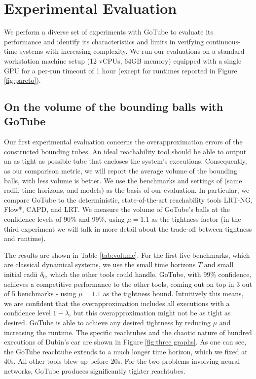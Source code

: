 \documentclass[letterpaper]{article} %
\newcommand{\rd}{\delta}
\begin{document}
\section{Experimental Evaluation}
We perform a diverse set of experiments with GoTube to evaluate its performance and identify its characteristics and limits in verifying continuous-time systems with increasing complexity. We run our evaluations on a standard workstation machine setup (12 vCPUs, 64GB memory) equipped with a single GPU for a per-run timeout of 1 hour (except for runtimes reported in Figure \ref{fig:pareto}).

\subsection{On the volume of the bounding balls with GoTube}
Our first experimental evaluation concerns the overapproximation errors of the constructed bounding tubes.
An ideal reachability tool should be able to output an as tight as possible tube that encloses the system's executions. Consequently, as our comparison metric, we will report the average volume of the bounding balls, with less volume is better.
We use the benchmarks and settings of \cite{gruenbacher2020lagrangian} (same radii, time horizons, and models) as the basis of our evaluation. In particular, we compare GoTube to the deterministic, state-of-the-art reachability tools LRT-NG, Flow*, CAPD, and LRT. We measure the volume of GoTube's balls at the confidence levels of 90\% and 99\%, using $\mu=1.1$ as the tightness factor (in the third experiment we will talk in more detail about the trade-off between tightness and runtime).

The results are shown in Table \ref{tab:volume}. For the first five benchmarks, which are classical dynamical systems, we use the small time horizons $T$ and small initial radii $\rd_0$, which the other tools could handle. GoTube, with 99\% confidence, achieves a competitive performance to the other tools, coming out on top in 3 out of 5 benchmarks - using $\mu=1.1$ as the tightness bound. Intuitively this means, we are confident that the overapproximation includes all executions with a confidence level $1-\lambda$, but this overapproximation might not be as tight as desired. GoTube is able to achieve any desired tightness by reducing $\mu$ and increasing the runtime. The specific reachtubes and the chaotic nature of hundred executions of Dubin's car are shown in Figure \ref{fig:three graphs}. As one can see, the GoTube reachtube extends to a much longer time horizon, which we fixed at 40s. All other tools blew up before 20s. For the two problems involving neural networks, GoTube produces significantly tighter reachtubes.  
\end{document}
